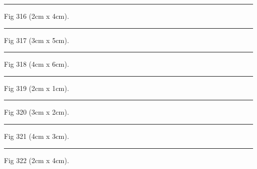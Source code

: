 \documentclass[a4paper,11pt]{article}
\begin{document}
\begin{swarmwrap}%
  \begin{minipage}[t]{2cm}
    \centering
    \rule{\linewidth}{4cm}
    {\footnotesize Fig 316 (2cm x 4cm).}
  \end{minipage}%
\end{swarmwrap}%
\swarmwrapnext
\lipsum[16]%

\begin{swarmwrap}%
  \begin{minipage}[t]{3cm}
    \centering
    \rule{\linewidth}{5cm}
    {\footnotesize Fig 317 (3cm x 5cm).}
  \end{minipage}%
\end{swarmwrap}%
\swarmwrapnext
\lipsum[17]%

\begin{swarmwrap}%
  \begin{minipage}[t]{4cm}
    \centering
    \rule{\linewidth}{6cm}
    {\footnotesize Fig 318 (4cm x 6cm).}
  \end{minipage}%
\end{swarmwrap}%
\swarmwrapnext
\lipsum[18]%

\begin{swarmwrap}%
  \begin{minipage}[t]{2cm}
    \centering
    \rule{\linewidth}{1cm}
    {\footnotesize Fig 319 (2cm x 1cm).}
  \end{minipage}%
\end{swarmwrap}%
\swarmwrapnext
\lipsum[19]%

\begin{swarmwrap}%
  \begin{minipage}[t]{3cm}
    \centering
    \rule{\linewidth}{2cm}
    {\footnotesize Fig 320 (3cm x 2cm).}
  \end{minipage}%
\end{swarmwrap}%
\swarmwrapnext
\lipsum[20]%

\begin{swarmwrap}%
  \begin{minipage}[t]{4cm}
    \centering
    \rule{\linewidth}{3cm}
    {\footnotesize Fig 321 (4cm x 3cm).}
  \end{minipage}%
\end{swarmwrap}%
\swarmwrapnext
\lipsum[21]%

\begin{swarmwrap}%
  \begin{minipage}[t]{2cm}
    \centering
    \rule{\linewidth}{4cm}
    {\footnotesize Fig 322 (2cm x 4cm).}
  \end{minipage}%
\end{swarmwrap}%
\swarmwrapnext
\lipsum[22]%
\end{document}
